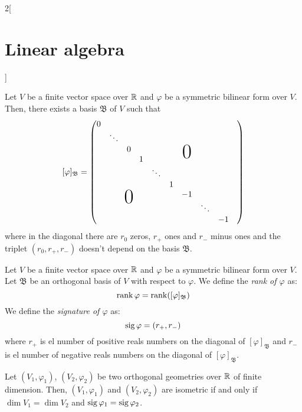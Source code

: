 \documentclass[../../../main.tex]{subfiles}
\begin{document}
\begin{multicols}{2}[\section{Linear algebra}]
\begin{prop}
  \end{prop}
  \begin{theorem}
    Let $V$ be a finite vector space over $\mathbb{R}$ and $\varphi$ be a symmetric bilinear form over $V$. Then, there exists a basis $\mathfrak{B}$ of $V$ such that $$[\varphi]_\mathfrak{B}=
      \begin{pmatrix}
        0 &        &          &   &        &   &          &        &    & \\
          & \ddots &          &   &        &   &          &        &      \\
          &        & 0        &   &        &   & \bigzero &        &      \\
          &        &          & 1 &        &   &          &        &      \\
          &        &          &   & \ddots &   &          &        &      \\
          &        &          &   &        & 1 &          &        &      \\
          &        & \bigzero &   &        &   & -1       &        &      \\
          &        &          &   &        &   &          & \ddots &      \\
          &        &          &   &        &   &          &        & -1
      \end{pmatrix}$$
    where in the diagonal there are $r_0$ zeros, $r_+$ ones and $r_-$ minus ones and the triplet $(r_0,r_+,r_-)$ doesn't depend on the basis $\mathfrak{B}$.
  \end{theorem}
  \begin{definition}
    Let $V$ be a finite vector space over $\mathbb{R}$ and $\varphi$ be a symmetric bilinear form over $V$. Let $\mathfrak{B}$ be an orthogonal basis of $V$ with respect to $\varphi$. We define the \textit{rank of $\varphi$} as: $$\rank \varphi=\rank ([\varphi]_\mathfrak{B})$$ We define the \textit{signature of $\varphi$} as: $$\operatorname{sig}\varphi=(r_+,r_-)$$ where $r_+$ is el number of positive reals numbers on the diagonal of $[\varphi]_\mathfrak{B}$ and $r_-$ is el number of negative reals numbers on the diagonal of $[\varphi]_\mathfrak{B}$.
  \end{definition}
  \begin{theorem}
    Let $(V_1,\varphi_1)$, $(V_2,\varphi_2)$ be two orthogonal geometries over $\mathbb{R}$ of finite dimension. Then, $(V_1,\varphi_1)$ and $(V_2,\varphi_2)$ are isometric if and only if $\dim V_1=\dim V_2$ and $\operatorname{sig} \varphi_1=\operatorname{sig} \varphi_2$.
  \end{theorem}

\end{multicols}
\end{document}
